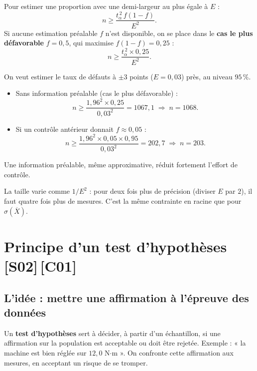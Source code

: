 \documentclass[a4paper,11pt]{article}
\begin{document}
\begin{theoreme}
Pour estimer une proportion avec une demi-largeur au plus égale à $E$ :
\[
\boxed{n \geq \frac{t_\alpha^{\,2}\, f(1-f)}{E^2}.}
\]
Si aucune estimation préalable $f$ n'est disponible, on se place dans le \textbf{cas le plus défavorable} $f = 0{,}5$, qui maximise $f(1-f) = 0{,}25$ :
\[
n \geq \frac{t_\alpha^{\,2} \times 0{,}25}{E^2}.
\]
\end{theoreme}

\begin{exemple}
On veut estimer le taux de défauts à $\pm 3$ points ($E = 0{,}03$) près, au niveau $95\,\%$.
\begin{itemize}
  \item Sans information préalable (cas le plus défavorable) :
  \[
  n \geq \frac{1{,}96^2 \times 0{,}25}{0{,}03^2} = 1067{,}1 \;\Longrightarrow\; n = 1068.
  \]
  \item Si un contrôle antérieur donnait $f \approx 0{,}05$ :
  \[
  n \geq \frac{1{,}96^2 \times 0{,}05 \times 0{,}95}{0{,}03^2} = 202{,}7 \;\Longrightarrow\; n = 203.
  \]
\end{itemize}
Une information préalable, même approximative, réduit fortement l'effort de contrôle.
\end{exemple}

\begin{remarque}
La taille varie comme $1/E^2$ : pour deux fois plus de précision (diviser $E$ par $2$), il faut quatre fois plus de mesures. C'est la même contrainte en racine que pour $\sigma(\overline{X})$.
\end{remarque}

\newpage
\section{Principe d'un test d'hypothèses \hfill {\normalsize\color{uimmred}[S02]\,[C01]}}

\subsection{L'idée : mettre une affirmation à l'épreuve des données}

Un \textbf{test d'hypothèses} sert à décider, à partir d'un échantillon, si une affirmation sur la population est acceptable ou doit être rejetée. Exemple : « la machine est bien réglée sur $12{,}0$ N$\cdot$m ». On confronte cette affirmation aux mesures, en acceptant un risque de se tromper.
\end{document}

